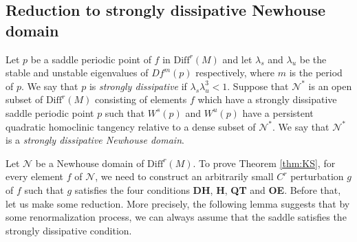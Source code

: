 \documentclass{amsart}
\theoremstyle{plain}
\theoremstyle{definition}
\theoremstyle{remark}
\numberwithin{equation}{section}
\begin{document}
\subsection{Reduction to strongly dissipative Newhouse domain}
Let $p$ be a saddle periodic point of $f$ in $\mathrm{Diff}^r(M)$ and let 
$\lambda_s$ and $\lambda_u$ be 
the stable and unstable eigenvalues of  $Df^m(p)$ respectively, where $m$ is the period of $p$.
We say that $p$ is \emph{strongly dissipative} 
if $\lambda_s\lambda_u^3<1$.
Suppose that $\mathcal{N}^\ast$ is an open subset of $\mathrm{Diff}^r(M)$ 
consisting of elements $f$ which have a strongly dissipative saddle periodic point $p$ 
such that $W^{s}(p)$ and $W^{u}(p)$ have a persistent quadratic homoclinic tangency relative to a dense subset of $\mathcal{N}^\ast$.
We say that $\mathcal{N}^\ast$ is a \emph{strongly dissipative Newhouse domain}.

Let $\mathcal{N}$ be a Newhouse domain of $\mbox{Diff}^r(M)$. To prove Theorem \ref{thm:KS}, for every element $f$ of $\mathcal{N}$, we need to construct an arbitrarily small $C^r$ perturbation $g$ of $f$ such that $g$ satisfies the four conditions {\bf DH}, {\bf H}, {\bf QT} and {\bf OE}. Before that, let us make some reduction. More precisely, the following lemma suggests that by some renormalization process, we can always assume that the saddle satisfies the strongly dissipative condition.  
\end{document}
